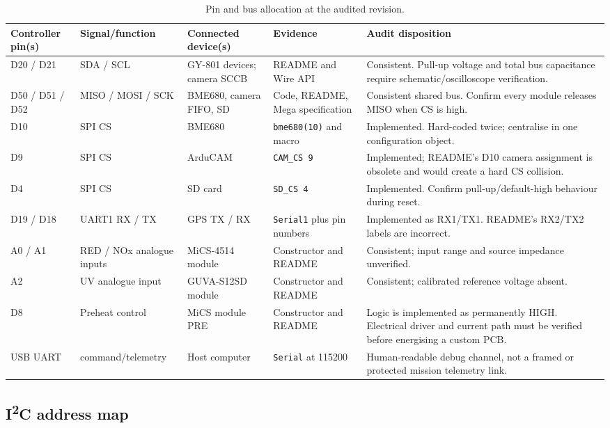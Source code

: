 \documentclass[11pt,a4paper]{article}
\newcommand{\code}[1]{\texttt{#1}}
\begin{document}
\begin{table}[H]
\centering
\caption{Pin and bus allocation at the audited revision.}
\label{tab:pins}
\footnotesize
\begin{tabularx}{\textwidth}{P{0.15\textwidth}P{0.18\textwidth}P{0.17\textwidth}P{0.19\textwidth}Y}
\toprule
Controller pin(s) & Signal/function & Connected device(s) & Evidence & Audit disposition\\
\midrule
D20 / D21 & SDA / SCL & GY-801 devices; camera SCCB & README and Wire API & Consistent. Pull-up voltage and total bus capacitance require schematic/oscilloscope verification.\\
D50 / D51 / D52 & MISO / MOSI / SCK & BME680, camera FIFO, SD & Code, README, Mega specification & Consistent shared bus. Confirm every module releases MISO when CS is high.\\
D10 & SPI CS & BME680 & \code{bme680(10)} and macro & Implemented. Hard-coded twice; centralise in one configuration object.\\
D9 & SPI CS & ArduCAM & \code{CAM\_CS 9} & Implemented; README's D10 camera assignment is obsolete and would create a hard CS collision.\\
D4 & SPI CS & SD card & \code{SD\_CS 4} & Implemented. Confirm pull-up/default-high behaviour during reset.\\
D19 / D18 & UART1 RX / TX & GPS TX / RX & \code{Serial1} plus pin numbers & Implemented as RX1/TX1. README's RX2/TX2 labels are incorrect.\\
A0 / A1 & RED / NOx analogue inputs & MiCS-4514 module & Constructor and README & Consistent; input range and source impedance unverified.\\
A2 & UV analogue input & GUVA-S12SD module & Constructor and README & Consistent; calibrated reference voltage absent.\\
D8 & Preheat control & MiCS module PRE & Constructor and README & Logic is implemented as permanently HIGH. Electrical driver and current path must be verified before energising a custom PCB.\\
USB UART & command/telemetry & Host computer & \code{Serial} at 115200 & Human-readable debug channel, not a framed or protected mission telemetry link.\\
\bottomrule
\end{tabularx}
\end{table}

\subsection{\texorpdfstring{I\textsuperscript{2}C}{I2C} address map}
\end{document}

